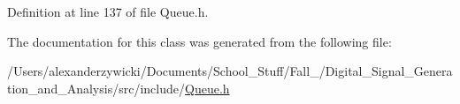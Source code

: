 Definition at line 137 of file Queue.\+h.



The documentation for this class was generated from the following file\+:\begin{DoxyCompactItemize}
\item 
/\+Users/alexanderzywicki/\+Documents/\+School\+\_\+\+Stuff/\+Fall\+\_/\+Digital\+\_\+\+Signal\+\_\+\+Generation\+\_\+and\+\_\+\+Analysis/src/include/\hyperlink{_queue_8h}{Queue.\+h}\end{DoxyCompactItemize}
